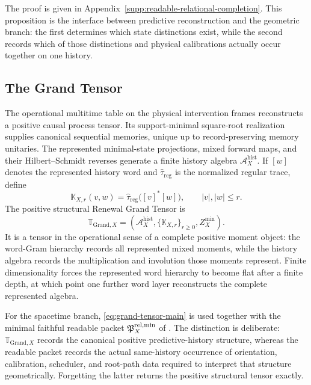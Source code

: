 \documentclass[11pt]{article}
\theoremstyle{definition}
\theoremstyle{remark}
\newcommand{\Grand}{\mathrm{Grand}}
\newcommand{\GTX}{\boldsymbol{\mathbb T}_{\Grand,X}}
\begin{document}
The proof is given in Appendix~\ref{supp:readable-relational-completion}.  This
proposition is the interface between predictive reconstruction and the
geometric branch: the first determines which state distinctions exist, while
the second records which of those distinctions and physical calibrations
actually occur together on one history.

\subsection{The Grand Tensor}

The operational multitime table on the physical intervention frames
reconstructs a positive causal process tensor.  Its support-minimal square-root
realization supplies canonical sequential memories, unique up to
record-preserving memory unitaries.  The represented minimal-state projections,
mixed forward maps, and their Hilbert--Schmidt reverses generate a finite
history algebra $\mathcal A_X^{\mathrm{hist}}$.  If $[w]$ denotes the
represented history word and $\widehat\tau_{\mathrm{reg}}$ is the normalized
regular trace, define
\begin{equation}
 \mathbb K_{X,r}(v,w)
 =\widehat\tau_{\mathrm{reg}}\bigl([v]^*[w]\bigr),
 \qquad |v|,|w|\le r.
 \label{eq:word-gram-main}
\end{equation}
The positive structural Renewal Grand Tensor is
\begin{equation}
 \boxed{
 \GTX
 =\left(
 \mathcal A_X^{\mathrm{hist}},
 \{\mathbb K_{X,r}\}_{r\ge0},
 Z_X^{\min}
 \right).}
 \label{eq:grand-tensor-main}
\end{equation}
It is a tensor in the operational sense of a complete positive moment object:
the word-Gram hierarchy records all represented mixed moments, while the
history algebra records the multiplication and involution those moments
represent.  Finite dimensionality forces the represented word hierarchy to
become flat after a finite depth, at which point one further word layer
reconstructs the complete represented algebra.

For the spacetime branch, \eqref{eq:grand-tensor-main} is used together with
the minimal faithful readable packet $\mathfrak P_X^{\rm rel,min}$ of
.  The distinction is deliberate:
$\GTX$ records the canonical positive predictive-history structure, whereas
the readable packet records the actual same-history occurrence of orientation,
calibration, scheduler, and root-path data required to interpret that
structure geometrically.  Forgetting the latter returns the positive
structural tensor exactly.
\end{document}
